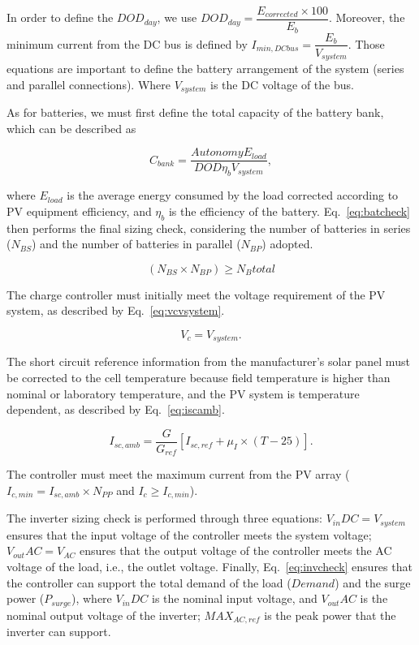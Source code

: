 \documentclass[journal]{IEEEtran}
\begin{document}
In order to define the $DOD_{day}$, we use $DOD_{day} = \dfrac{E_{corrected} \times 100}{E_{b}}$. Moreover, the minimum current from the DC bus is defined by $I_{min,DCbus} = \dfrac{E_{b}}{V_{system}}$. Those equations are important to define the battery arrangement of the system (series and parallel connections). Where $V_{system}$ is the DC voltage of the bus. 

As for batteries, we must first define the total capacity of the battery bank, which can be described as

\begin{equation}
\label{eq:Cbank}
C_{bank} = \dfrac{Autonomy E_{load}}{DOD \eta _{b} V_{system}},
\end{equation}

\noindent where $ E_{load} $ is the average energy consumed by the load corrected according to PV equipment efficiency, and $ \eta_{b} $ is the efficiency of the battery.
%
Eq.~\ref{eq:batcheck} then performs the final sizing check, considering the number of batteries in series ($ N_{BS} $) and the number of batteries in parallel ($ N_{BP} $) adopted.

\begin{equation}
\label{eq:batcheck}
\left( N_{BS} \times N_{BP} \right) \geq N_{B}total
\end{equation}

The charge controller must initially meet the voltage requirement of the PV system, as described by Eq.~\eqref{eq:vcvsystem}.
 
\begin{equation}
\label{eq:vcvsystem}
V_{c} = V_{system}.
\end{equation}

The short circuit reference information from the manufacturer's solar panel must be corrected to the cell temperature because field temperature is higher than nominal or laboratory temperature, and the PV system is temperature dependent, as described by Eq.~\eqref{eq:iscamb}. 

\begin{equation}
\label{eq:iscamb}
I_{sc,amb} = \dfrac{G}{G_{ref}} \left[ I_{sc,ref} + \mu_{I} \times (T-25) \right]. 
\end{equation}

The controller must meet the maximum current from the PV array ($I_{c,min} = I_{sc,amb} \times N_{PP}$ and $I_{c} \geq I_{c,min}$).

The inverter sizing check is performed through three equations: $V_{in}DC = V_{system}$ ensures that the input voltage of the controller meets the system voltage; $V_{out}AC = V_{AC}$ ensures that the output voltage of the controller meets the AC voltage of the load, i.e., the outlet voltage. Finally, Eq.~\eqref{eq:invcheck} ensures that the controller can support the total demand of the load ($Demand$) and the surge power ($P_{surge}$), where $V_{in}DC$ is the nominal input voltage, and $V_{out}AC$ is the nominal output voltage of the inverter; $MAX_{AC,ref}$ is the peak power that the inverter can support.
\end{document}
